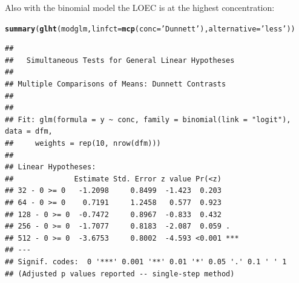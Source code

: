 \documentclass{scrartcl}\usepackage[]{graphicx}\usepackage[]{color}
\makeatletter
\newcommand{\hlstr}[1]{\textcolor[rgb]{0.192,0.494,0.8}{#1}}%
\newcommand{\hlstd}[1]{\textcolor[rgb]{0.345,0.345,0.345}{#1}}%
\newcommand{\hlkwc}[1]{\textcolor[rgb]{0.333,0.667,0.333}{#1}}%
\newcommand{\hlkwd}[1]{\textcolor[rgb]{0.737,0.353,0.396}{\textbf{#1}}}%
\newenvironment{kframe}{%
 \def\at@end@of@kframe{}%
 \ifinner\ifhmode%
  \def\at@end@of@kframe{\end{minipage}}%
  \begin{minipage}{\columnwidth}%
 \fi\fi%
 \def\FrameCommand##1{\hskip\@totalleftmargin \hskip-\fboxsep
 \colorbox{shadecolor}{##1}\hskip-\fboxsep
     \hskip-\linewidth \hskip-\@totalleftmargin \hskip\columnwidth}%
 \MakeFramed {\advance\hsize-\width
   \@totalleftmargin\z@ \linewidth\hsize
   \@setminipage}}%
 {\par\unskip\endMakeFramed%
 \at@end@of@kframe}
\newenvironment{knitrout}{}{} %
\makeatother
\begin{document}
Also with the binomial model the LOEC is at the highest concentration:
\begin{knitrout}
\color{fgcolor}\begin{kframe}
\begin{alltt}
\hlkwd{summary}\hlstd{(}\hlkwd{glht}\hlstd{(modglm,} \hlkwc{linfct} \hlstd{=} \hlkwd{mcp}\hlstd{(}\hlkwc{conc} \hlstd{=} \hlstr{'Dunnett'}\hlstd{),} \hlkwc{alternative} \hlstd{=} \hlstr{'less'}\hlstd{))}
\end{alltt}
\begin{verbatim}
## 
## 	 Simultaneous Tests for General Linear Hypotheses
## 
## Multiple Comparisons of Means: Dunnett Contrasts
## 
## 
## Fit: glm(formula = y ~ conc, family = binomial(link = "logit"), data = dfm, 
##     weights = rep(10, nrow(dfm)))
## 
## Linear Hypotheses:
##              Estimate Std. Error z value Pr(<z)    
## 32 - 0 >= 0   -1.2098     0.8499  -1.423  0.203    
## 64 - 0 >= 0    0.7191     1.2458   0.577  0.923    
## 128 - 0 >= 0  -0.7472     0.8967  -0.833  0.432    
## 256 - 0 >= 0  -1.7077     0.8183  -2.087  0.059 .  
## 512 - 0 >= 0  -3.6753     0.8002  -4.593 <0.001 ***
## ---
## Signif. codes:  0 '***' 0.001 '**' 0.01 '*' 0.05 '.' 0.1 ' ' 1
## (Adjusted p values reported -- single-step method)
\end{verbatim}
\end{kframe}
\end{knitrout}









\end{document}
